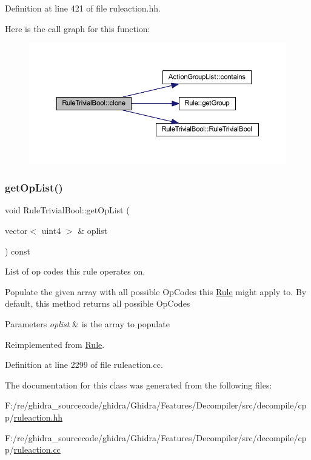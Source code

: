 Definition at line 421 of file ruleaction.\+hh.

Here is the call graph for this function\+:
\nopagebreak
\begin{figure}[H]
\begin{center}
\leavevmode
\includegraphics[width=350pt]{class_rule_trivial_bool_a889c0573c7bc1c1d231ec03bd58a13c0_cgraph}
\end{center}
\end{figure}
\mbox{\label{class_rule_trivial_bool_acdd8aeb672d69e778194b2cc750ba143}} 
\subsubsection{\texorpdfstring{getOpList()}{getOpList()}}
{\footnotesize\ttfamily void Rule\+Trivial\+Bool\+::get\+Op\+List (\begin{DoxyParamCaption}\item[{vector$<$ uint4 $>$ \&}]{oplist }\end{DoxyParamCaption}) const\hspace{0.3cm}{\ttfamily [virtual]}}



List of op codes this rule operates on. 

Populate the given array with all possible Op\+Codes this \mbox{\hyperlink{class_rule}{Rule}} might apply to. By default, this method returns all possible Op\+Codes 
\begin{DoxyParams}{Parameters}
{\em oplist} & is the array to populate \\
\hline
\end{DoxyParams}


Reimplemented from \mbox{\hyperlink{class_rule_a4023bfc7825de0ab866790551856d10e}{Rule}}.



Definition at line 2299 of file ruleaction.\+cc.



The documentation for this class was generated from the following files\+:\begin{DoxyCompactItemize}
\item 
F\+:/re/ghidra\+\_\+sourcecode/ghidra/\+Ghidra/\+Features/\+Decompiler/src/decompile/cpp/\mbox{\hyperlink{ruleaction_8hh}{ruleaction.\+hh}}\item 
F\+:/re/ghidra\+\_\+sourcecode/ghidra/\+Ghidra/\+Features/\+Decompiler/src/decompile/cpp/\mbox{\hyperlink{ruleaction_8cc}{ruleaction.\+cc}}\end{DoxyCompactItemize}
